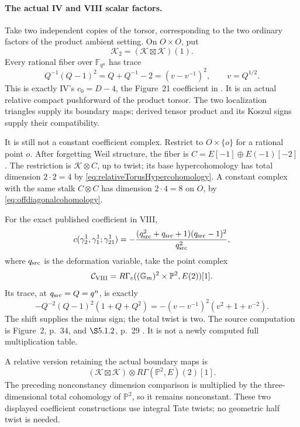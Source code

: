 \paragraph{The actual IV and VIII scalar factors.}
Take two independent copies of the torsor, corresponding to
the two ordinary factors of the product ambient setting.
On \(O\times O\), put
\[
                   \mathcal K_2=(\mathcal K\boxtimes\mathcal K)(1).
\]
Every rational fiber over \(\mathbb F_{q^n}\) has trace
\begin{equation}\label{eq:relativeczerotrace}
 Q^{-1}(Q-1)^2=Q+Q^{-1}-2
             =(v-v^{-1})^2,\qquad v=Q^{1/2}.
\end{equation}
This is exactly IV's \(c_0=D-4\), the Figure~21 coefficient
in  \cite[Example~19.3, pp.~133--135]{IV}.
It is an actual relative compact pushforward of the product
torsor. The two localization triangles supply its boundary
maps; derived tensor product and its Koszul signs supply
their compatibility.

It is still not a constant coefficient complex.
Restrict to \(O\times\{o\}\) for a rational point \(o\).
After forgetting Weil structure, the fiber is
\(C=E[-1]\oplus E(-1)[-2]\).
The restriction is \(\mathcal K\otimes C\), up to twist;
its base hypercohomology has total dimension \(2\cdot2=4\)
by \eqref{eq:relativeTorusHypercohomology}.
A constant complex with the same stalk \(C\otimes C\)
has dimension \(2\cdot4=8\) on \(O\), by
\eqref{eq:offdiagonalcohomology}.

For the exact published coefficient in VIII,
\[
 c(\gamma_2^1,\gamma_1^1;\gamma_{21}^1)
   =-\frac{(q_{\rm src}^2+q_{\rm src}+1)(q_{\rm src}-1)^2}
           {q_{\rm src}^2},
\]
where \(q_{\rm src}\) is the deformation variable,
take the point complex
\begin{equation}\label{eq:VIIIgeometriccoefficient}
 \mathcal C_{\rm VIII}
   =R\Gamma_c((\mathbb G_m)^2\times\mathbb P^2,E(2))[1].
\end{equation}
Its trace, at \(q_{\rm src}=Q=q^n\), is exactly
\[
 -Q^{-2}(Q-1)^2(1+Q+Q^2)
       =-(v-v^{-1})^2(v^2+1+v^{-2}).
\]
The shift supplies the minus sign; the total twist is two.
The source computation is Figure~2, p.~34, and
\(\S5.1.2\), p.~29 \cite{VIII}.
It is not a newly computed full multiplication table.

A relative version retaining the actual boundary maps is
\[
 (\mathcal K\boxtimes\mathcal K)\otimes
                   R\Gamma(\mathbb P^2,E)(2)[1].
\]
The preceding nonconstancy dimension comparison is multiplied
by the three-dimensional total cohomology of \(\mathbb P^2\),
so it remains nonconstant. These two displayed coefficient
constructions use integral Tate twists; no geometric half
twist is needed.

